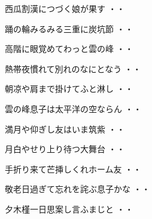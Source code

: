 \begin{shiika}西瓜割漢につづく娘が果す
\hfill{・・}\end{shiika}
\vspace{0.6cm}
\begin{shiika}踊の輪みるみる三重に炭坑節
\hfill{・・}\end{shiika}
\vspace{0.6cm}
\begin{shiika}高階に眼覚めてわっと雲の峰
\hfill{・・}\end{shiika}
\vspace{0.6cm}
\begin{shiika}熱帯夜慣れて別れのなにとなう
\hfill{・・}\end{shiika}
\vspace{0.6cm}
\begin{shiika}朝凉や肩まで掛けてふと淋し
\hfill{・・}\end{shiika}
\vspace{0.6cm}
\begin{shiika}雲の峰息子は太平洋の空ならん
\hfill{・・}\end{shiika}
\vspace{0.6cm}
\begin{shiika}満月や仰ぎし友はいま筑紫
\hfill{・・}\end{shiika}
\vspace{0.6cm}
\begin{shiika}月白やせり上り待つ大舞台
\hfill{・・}\end{shiika}
\vspace{0.6cm}
\begin{shiika}手折り来て芒挿しくれホーム友
\hfill{・・}\end{shiika}
\vspace{0.6cm}
\begin{shiika}敬老日過ぎて忘れを詫ぶ息子かな
\hfill{・・}\end{shiika}
\vspace{0.6cm}
\begin{shiika}夕木槿一日思案し言ふまじと
\hfill{・・}\end{shiika}
\vspace{0.6cm}
